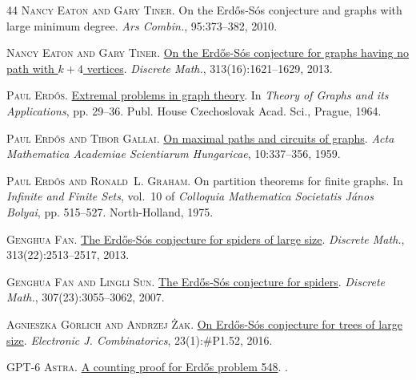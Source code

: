 \documentclass[a4paper,11pt]{article}
\begin{document}
\begin{thebibliography}{44}
\textsc{Nancy Eaton and Gary Tiner}.
\newblock On the {Erd{\H{o}}s}-{S}\'os conjecture and graphs with large minimum
  degree.
\newblock \emph{Ars Combin.}, 95:373--382, 2010.

\textsc{Nancy Eaton and Gary Tiner}.
\newblock \href{https://doi.org/10.1016/j.disc.2013.04.024}{On the
  {Erd{\H{o}}s}-{S}\'os conjecture for graphs having no path with {$k+4$}
  vertices}.
\newblock \emph{Discrete Math.}, 313(16):1621--1629, 2013.

\textsc{Paul Erd{\H{o}}s}.
\newblock \href{http://www.renyi.hu/~p\_erdos/1964-06.pdf}{Extremal problems in
  graph theory}.
\newblock In \emph{Theory of {G}raphs and its {A}pplications}, pp. 29--36.
  Publ. House Czechoslovak Acad. Sci., Prague, 1964.

\textsc{Paul Erd{\H{o}}s and Tibor Gallai}.
\newblock \href{https://doi.org/10.1007/BF02024498}{On maximal paths and
  circuits of graphs}.
\newblock \emph{Acta Mathematica Academiae Scientiarum Hungaricae},
  10:337--356, 1959.

\textsc{Paul Erd{\H{o}}s and Ronald~L. Graham}.
\newblock On partition theorems for finite graphs.
\newblock In \emph{Infinite and Finite Sets}, vol.~10 of \emph{Colloquia
  Mathematica Societatis J{\'a}nos Bolyai}, pp. 515--527. North-Holland, 1975.

\textsc{Genghua Fan}.
\newblock \href{https://doi.org/10.1016/j.disc.2013.07.021}{The
  {Erd{\H{o}}s}-{S}\'os conjecture for spiders of large size}.
\newblock \emph{Discrete Math.}, 313(22):2513--2517, 2013.

\textsc{Genghua Fan and Lingli Sun}.
\newblock \href{https://doi.org/10.1016/j.disc.2007.03.018}{The
  {Erd{\H{o}}s}-{S}\'os conjecture for spiders}.
\newblock \emph{Discrete Math.}, 307(23):3055--3062, 2007.

\textsc{Agnieszka G{\"o}rlich and Andrzej {\.Z}ak}.
\newblock \href{https://doi.org/10.37236/5341}{On {Erd{\H{o}}s-S{\'o}s}
  conjecture for trees of large size}.
\newblock \emph{Electronic J. Combinatorics}, 23(1):\#P1.52, 2016.

\textsc{{GPT-6 Astra}}.
\newblock \href{https://www.erdosproblems.com/static/548copy.pdf}{A counting
  proof for {Erd\H{o}s} problem 548}.
.


\end{thebibliography}
\end{document}
